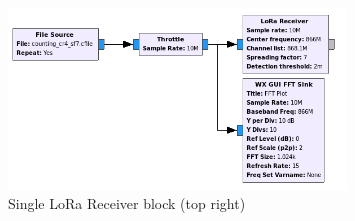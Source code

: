 \begin{figure}[h]
    \centering
    \includegraphics[width=0.8\textwidth]{figures/robyns_gnu.png}
    \caption{Single LoRa Receiver block (top right)~\cite{robyns_implementation}}
    \label{fig:robyns_gnu}
\end{figure}


